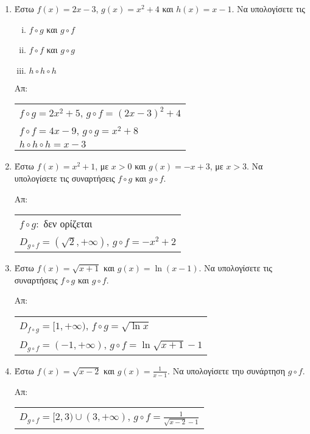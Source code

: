 \documentclass[a4paper,table]{report}
\begin{document}
\begin{center}
\end{center}

\vspace{\baselineskip}


\begin{enumerate}
    \item Έστω $ f(x) = 2x-3 $, $ g(x) = x^{2}+4 $ και $ h(x) = x-1 $. 
        Να υπολογίσετε τις 
        \begin{enumerate}[i)]
            \item $ f \circ g $ και $ g \circ f $
            \item $ f \circ f $ και $ g \circ g $
            \item $ h \circ h \circ h $
        \end{enumerate}

        \hfill Απ:  \begin{tabular}{l}
            $ f \circ g = 2x^{2}+5 $, $ g \circ f = (2x-3)^{2}+4 $ \\
            $ f \circ f = 4x-9 $, $ g \circ g = x^{2}+8 $ \\
            $ h \circ h \circ h = x-3 $
        \end{tabular}

    \item Έστω $ f(x) = x^{2}+1 $, με $ x>0 $ και $ g(x) = -x+3 $, με $ x>3 $. 
        Να υπολογίσετε τις συναρτήσεις $ f \circ g $ και $ g \circ f $.

        \hfill Απ: \begin{tabular}{l}
            $ f \circ g : $ δεν ορίζεται \\
            $ D_{g \circ f}=(\sqrt{2}, +\infty) $, $ g \circ f = -x^{2}+2 $
        \end{tabular}

    \item Έστω $ f(x) = \sqrt{x+1} $ και $ g(x) = \ln{(x-1)} $. Να υπολογίσετε 
        τις συναρτήσεις $ f \circ g $ και $ g \circ f $.

        \hfill Απ:  \begin{tabular}{l}
            $ D_{f \circ g}=[1,+\infty) $, $ f \circ g = \sqrt{\ln{x}} $ \\
            $ D_{g \circ f}=(-1,+\infty) $, $ g \circ f = \ln{\sqrt{x+1}} -1$
        \end{tabular}

    \item Έστω $ f(x) = \sqrt{x-2} $ και $ g(x) = \frac{1}{x-1} $. Να υπολογίσετε 
        τηυ συνάρτηση $ g \circ f $.

        \hfill Απ:  \begin{tabular}{l}
            $ D_{g \circ f}= [2,3) \cup (3,+\infty) $, 
            $ g \circ f = \frac{1}{\sqrt{x-2} -1} $
        \end{tabular}
\end{enumerate}
\end{document}

